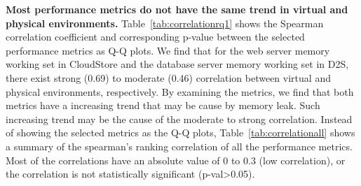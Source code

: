 \textbf{Most performance metrics do not have the same trend in virtual and physical environments.} Table~\ref{tab:correlationrq1} shows the Spearman correlation coefficient and corresponding p-value between the selected performance metrics as Q-Q plots. We find that for the web server memory working set in CloudStore and the database server memory working set in D2S, there exist strong (0.69) to moderate (0.46) correlation between virtual and physical environments, respectively. By examining the metrics, we find that both metrics have a increasing trend that may be cause by memory leak. Such increasing trend may be the cause of the moderate to strong correlation. Instead of showing the selected metrics as the Q-Q plots, Table~\ref{tab:correlationall} shows a summary of the spearman's ranking correlation of all the performance metrics. Most of the correlations have an absolute value of 0 to 0.3 (low correlation), or the correlation is not statistically significant (p-val\textgreater0.05).






